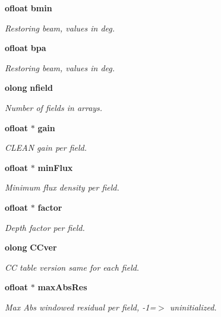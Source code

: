 \begin{CompactItemize}
{\bf ofloat} {\bf bmin}
\begin{CompactList}\small\item\em Restoring beam, values in deg. \item\end{CompactList}\item 
{\bf ofloat} {\bf bpa}
\begin{CompactList}\small\item\em Restoring beam, values in deg. \item\end{CompactList}\item 
{\bf olong} {\bf nfield}
\begin{CompactList}\small\item\em Number of fields in arrays. \item\end{CompactList}\item 
{\bf ofloat} $\ast$ {\bf gain}
\begin{CompactList}\small\item\em CLEAN gain per field. \item\end{CompactList}\item 
{\bf ofloat} $\ast$ {\bf min\-Flux}
\begin{CompactList}\small\item\em Minimum flux density per field. \item\end{CompactList}\item 
{\bf ofloat} $\ast$ {\bf factor}
\begin{CompactList}\small\item\em Depth factor per field. \item\end{CompactList}\item 
{\bf olong} {\bf CCver}
\begin{CompactList}\small\item\em CC table version same for each field. \item\end{CompactList}\item 
{\bf ofloat} $\ast$ {\bf max\-Abs\-Res}
\begin{CompactList}\small\item\em Max Abs windowed residual per field, -1=$>$ uninitialized. \item\end{CompactList}\item 

\end{CompactItemize}
